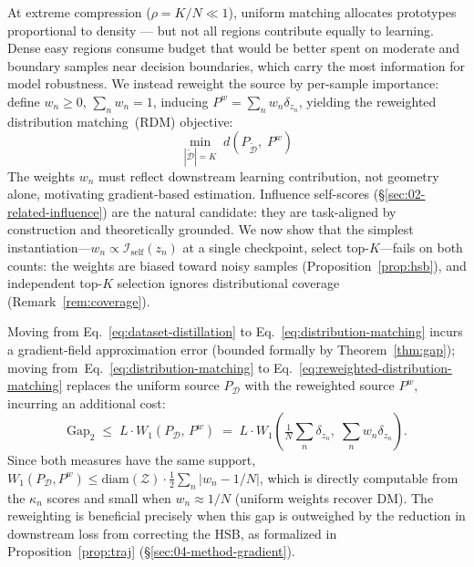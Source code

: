 \begin{foldable} %
  At extreme compression ($\rho = K/N \ll 1$), uniform matching allocates prototypes proportional to density --- but not all regions contribute equally to learning.
  Dense easy regions consume budget that would be better spent on moderate and boundary samples near decision boundaries, which carry the most information for model robustness.
  We instead reweight the source by per-sample importance: define $w_n \geq 0$, $\sum_n w_n = 1$, inducing $P^w = \sum_n w_n \delta_{z_n}$, yielding the reweighted distribution matching~(RDM) objective:
  \begin{equation}
    \min_{|\tilde{\mathcal{D}}| = K}\; d\!\left(P_{\tilde{\mathcal{D}}},\; P^w\right)
    \label{eq:reweighted-distribution-matching}
  \end{equation}
  The weights $w_n$ must reflect downstream learning contribution, not geometry alone, motivating gradient-based estimation.
  Influence self-scores (\S\ref{sec:02-related-influence}) are the natural candidate: they are task-aligned by construction and theoretically grounded.
  We now show that the simplest instantiation---$w_n \propto \mathcal{I}_\text{self}(z_n)$ at a single checkpoint, select top-$K$---fails on both counts: the weights are biased toward noisy samples (Proposition~\ref{prop:hsb}), and independent top-$K$ selection ignores distributional coverage (Remark~\ref{rem:coverage}).
  \begin{remark} \label{rem:double-gap}
    Moving from Eq.~\ref{eq:dataset-distillation} to Eq.~\ref{eq:distribution-matching} incurs a gradient-field approximation error (bounded formally by Theorem~\ref{thm:gap}); moving from~Eq.~\ref{eq:distribution-matching} to Eq.~\ref{eq:reweighted-distribution-matching} replaces the uniform source $P_\mathcal{D}$ with the reweighted source $P^w$, incurring an additional cost:
    \begin{equation}
      \mathrm{Gap}_2 \;\leq\; L \cdot W_1(P_\mathcal{D},\, P^w) \;=\; L \cdot W_1\!\left(\tfrac{1}{N}\textstyle\sum_n \delta_{z_n},\; \textstyle\sum_n w_n \delta_{z_n}\right).
      \label{eq:gap2}
    \end{equation}
    Since both measures have the same support, $W_1(P_\mathcal{D}, P^w) \leq \mathrm{diam}(\mathcal{Z}) \cdot \frac{1}{2}\sum_n |w_n - 1/N|$, which is directly computable from the $\kappa_n$ scores and small when $w_n \approx 1/N$ (uniform weights recover DM).
    The reweighting is beneficial precisely when this gap is outweighed by the reduction in downstream loss from correcting the HSB, as formalized in Proposition~\ref{prop:traj} (\S\ref{sec:04-method-gradient}).
  \end{remark}
\end{foldable}

